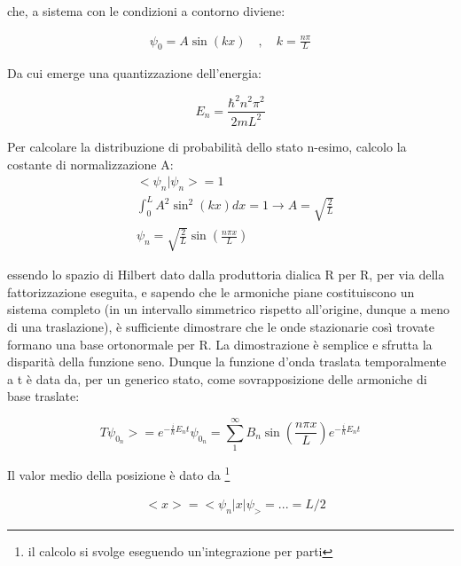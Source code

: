 \documentclass{article}
\begin{document}
che, a sistema con le condizioni a contorno diviene:

\begin{equation}
    \begin{aligned}
        \psi_0= A\sin(kx) \quad , \quad k=\frac{n\pi}{L}
    \end{aligned}
\end{equation}

Da cui emerge una quantizzazione dell'energia:

\begin{equation}
    E_n=\frac{\hbar^2n^2\pi^2}{2mL^2}
\end{equation}

Per calcolare la distribuzione di probabilità dello stato n-esimo, calcolo la costante di normalizzazione A:
\begin{equation}
    \begin{aligned}
         & <\psi_n | \psi_n>=1                                              \\
         & \int_{0}^{L} A^2\sin^2(kx)dx=1  \rightarrow A=\sqrt{\frac{2}{L}} \\
         & \psi_n=\sqrt{\frac{2}{L}}\sin(\frac{n\pi x}{L})
    \end{aligned}
\end{equation}

essendo lo spazio di Hilbert dato dalla produttoria dialica R per R, per via della fattorizzazione eseguita, e sapendo che le armoniche piane costituiscono un sistema completo (in un intervallo simmetrico rispetto all'origine, dunque a meno di una traslazione),
è sufficiente dimostrare che le onde stazionarie così trovate formano una base ortonormale per R.
La dimostrazione è semplice e sfrutta la disparità della funzione seno.
Dunque la funzione d'onda traslata temporalmente a t è data da, per un generico stato, come sovrapposizione delle armoniche di base traslate:

\begin{equation}
    T\psi_{0_n}>= e^{-\frac{i}{\hbar}E_nt}\psi_{0_n}= \sum_{1}^{\infty} B_n \sin(\frac{n\pi x}{L})e^{-\frac{i}{\hbar}E_nt}
\end{equation}

Il valor medio della posizione è dato da \footnote{il calcolo si svolge eseguendo un'integrazione per parti}

\begin{equation}
    \begin{aligned}
         & <x>=<\psi_n |x|\psi_>=...=L/2
    \end{aligned}
\end{equation}
\end{document}
